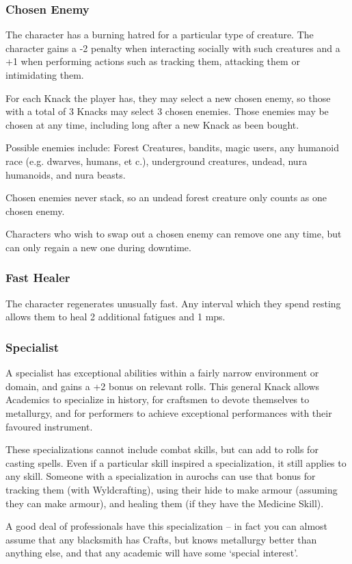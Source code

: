 \begin{multicols}{2}

\subsubsection{Chosen Enemy}

The character has a burning hatred for a particular type of creature.
The character gains a -2 penalty when interacting socially with such creatures and a +1 when performing actions such as tracking them, attacking them or intimidating them.

For each Knack the player has, they may select a new chosen enemy, so those with a total of 3 Knacks may select 3 chosen enemies. Those enemies may be chosen at any time, including long after a new Knack as been bought.

Possible enemies include: Forest Creatures, bandits, magic users, any humanoid race (e.g. dwarves, humans, et c.), underground creatures, %
undead, nura humanoids, and nura beasts.%

Chosen enemies never stack, so an undead forest creature only counts as one chosen enemy.

Characters who wish to swap out a chosen enemy can remove one any time, but can only regain a new one during \gls{downtime}.

\subsubsection{Fast Healer}

The character regenerates unusually fast.
Any interval which they spend resting allows them to heal 2 additional \glspl{fatigue} and 1 \glspl{mp}.

\subsubsection{Specialist}
\label{specialist}

A specialist has exceptional abilities within a fairly narrow environment or domain, and gains a +2 bonus on relevant rolls.
This general Knack allows Academics to specialize in history, for craftsmen to devote themselves to metallurgy, and for performers to achieve exceptional performances with their favoured instrument.

These specializations cannot include combat skills, but can add to rolls for casting spells.
Even if a particular skill inspired a specialization, it still applies to any skill.
Someone with a specialization in aurochs can use that bonus for tracking them (with Wyldcrafting), using their hide to make armour (assuming they can make armour), and healing them (if they have the Medicine Skill).

A good deal of professionals have this specialization -- in fact you can almost assume that any blacksmith has Crafts, but knows metallurgy better than anything else, and that any academic will have some `special interest'.

\end{multicols}
